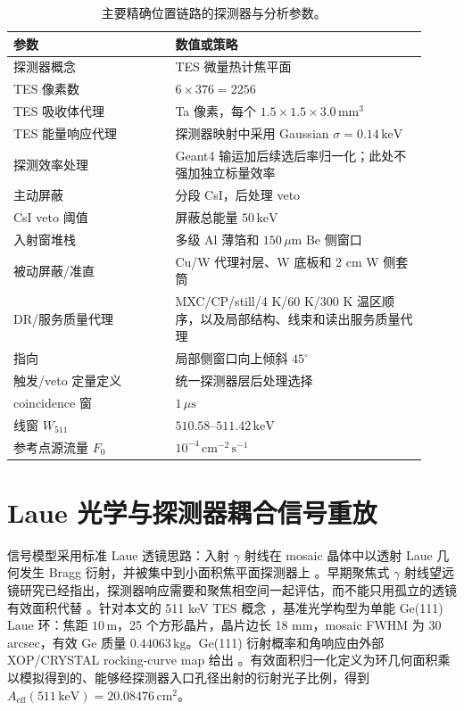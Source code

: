 \documentclass[preprint,12pt]{elsarticle}
\newcommand{\keV}{\,\mathrm{keV}}
\newcommand{\cms}{\,\mathrm{cm^{-2}\,s^{-1}}}
\newcommand{\wii}{W_{511}}
\newcommand{\aeff}{A_{\mathrm{eff}}}
\newcommand{\fzero}{F_{0}}
\begin{document}
\begin{table}[t]
\centering
\caption{主要精确位置链路的探测器与分析参数。}
\label{tab:geometry}
\begin{tabular}{p{0.36\linewidth}p{0.56\linewidth}}
\toprule
参数 & 数值或策略 \\
\midrule
探测器概念 & TES 微量热计焦平面 \\
TES 像素数 & $6\times376=2256$ \\
TES 吸收体代理 & Ta 像素，每个 $1.5\times1.5\times3.0\,\mathrm{mm^3}$ \\
TES 能量响应代理 & 探测器映射中采用 Gaussian $\sigma=0.14\keV$ \\
探测效率处理 & Geant4 输运加后续选后率归一化；此处不强加独立标量效率 \\
主动屏蔽 & 分段 CsI，后处理 veto \\
CsI veto 阈值 & 屏蔽总能量 $50\keV$ \\
入射窗堆栈 & 多级 Al 薄箔和 $150\,\mu\mathrm{m}$ Be 侧窗口 \\
被动屏蔽/准直 & Cu/W 代理衬层、W 底板和 2 cm W 侧套筒 \\
DR/服务质量代理 & MXC/CP/still/4 K/60 K/300 K 温区顺序，以及局部结构、线束和读出服务质量代理 \\
指向 & 局部侧窗口向上倾斜 $45^\circ$ \\
触发/veto 定量定义 & 统一探测器层后处理选择 \\
coincidence 窗 & $1\,\mu\mathrm{s}$ \\
线窗 $\wii$ & $510.58$--$511.42\keV$ \\
参考点源流量 $\fzero$ & $10^{-4}\cms$ \\
\bottomrule
\end{tabular}
\end{table}

\clearpage

\section{Laue 光学与探测器耦合信号重放}
\label{sec:optics}

信号模型采用标准 Laue 透镜思路：入射 $\gamma$ 射线在 mosaic 晶体中以透射 Laue 几何发生 Bragg 衍射，并被集中到小面积焦平面探测器上 \cite{Barriere2009Laue,Barriere2011LauePrototype}。早期聚焦式 $\gamma$ 射线望远镜研究已经指出，探测器响应需要和聚焦相空间一起评估，而不能只用孤立的透镜有效面积代替 \cite{Weidenspointner2006MAX}。针对本文的 511 keV TES 概念 \cite{Shirazi2023}，基准光学构型为单能 Ge(111) Laue 环：焦距 $10\,\mathrm{m}$，25 个方形晶片，晶片边长 18 mm，mosaic FWHM 为 30 arcsec，有效 Ge 质量 $0.44063\,\mathrm{kg}$。Ge(111) 衍射概率和角响应由外部 XOP/CRYSTAL rocking-curve map 给出 \cite{SanchezDelRio2011XOP}。有效面积归一化定义为环几何面积乘以模拟得到的、能够经探测器入口孔径出射的衍射光子比例，得到 $\aeff(511\keV)=20.08476\,\mathrm{cm^2}$。
\end{document}
